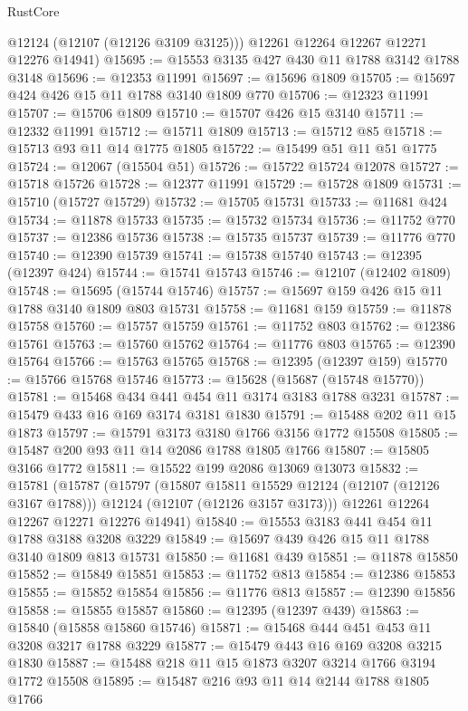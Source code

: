 \begin{lexlean}{RustCore}
\begin{coremodule}
        @12124
        (@12107 (@12126 @3109 @3125)))
      @12261
      @12264
      @12267
      @12271
      @12276
      @14941)
@15695 := @15553 @3135 @427 @430 @11 @1788 @3142 @1788 @3148
@15696 := @12353 @11991
@15697 := @15696 @1809
@15705 := @15697 @424 @426 @15 @11 @1788 @3140 @1809 @770
@15706 := @12323 @11991
@15707 := @15706 @1809
@15710 := @15707 @426 @15 @3140
@15711 := @12332 @11991
@15712 := @15711 @1809
@15713 := @15712 @85
@15718 := @15713 @93 @11 @14 @1775 @1805
@15722 := @15499 @51 @11 @51 @1775
@15724 := @12067 (@15504 @51)
@15726 := @15722 @15724 @12078
@15727 := @15718 @15726
@15728 := @12377 @11991
@15729 := @15728 @1809
@15731 := @15710 (@15727 @15729)
@15732 := @15705 @15731
@15733 := @11681 @424
@15734 := @11878 @15733
@15735 := @15732 @15734
@15736 := @11752 @770
@15737 := @12386 @15736
@15738 := @15735 @15737
@15739 := @11776 @770
@15740 := @12390 @15739
@15741 := @15738 @15740
@15743 := @12395 (@12397 @424)
@15744 := @15741 @15743
@15746 := @12107 (@12402 @1809)
@15748 := @15695 (@15744 @15746)
@15757 := @15697 @159 @426 @15 @11 @1788 @3140 @1809 @803 @15731
@15758 := @11681 @159
@15759 := @11878 @15758
@15760 := @15757 @15759
@15761 := @11752 @803
@15762 := @12386 @15761
@15763 := @15760 @15762
@15764 := @11776 @803
@15765 := @12390 @15764
@15766 := @15763 @15765
@15768 := @12395 (@12397 @159)
@15770 := @15766 @15768 @15746
@15773 := @15628 (@15687 (@15748 @15770))
@15781 := @15468 @434 @441 @454 @11 @3174 @3183 @1788 @3231
@15787 := @15479 @433 @16 @169 @3174 @3181 @1830
@15791 := @15488 @202 @11 @15 @1873
@15797 := @15791 @3173 @3180 @1766 @3156 @1772 @15508
@15805 := @15487 @200 @93 @11 @14 @2086 @1788 @1805 @1766
@15807 := @15805 @3166 @1772
@15811 := @15522 @199 @2086 @13069 @13073
@15832 := @15781
    (@15787
      (@15797
        (@15807 @15811 @15529 @12124 (@12107 (@12126 @3167 @1788)))
        @12124
        (@12107 (@12126 @3157 @3173)))
      @12261
      @12264
      @12267
      @12271
      @12276
      @14941)
@15840 := @15553 @3183 @441 @454 @11 @1788 @3188 @3208 @3229
@15849 := @15697 @439 @426 @15 @11 @1788 @3140 @1809 @813 @15731
@15850 := @11681 @439
@15851 := @11878 @15850
@15852 := @15849 @15851
@15853 := @11752 @813
@15854 := @12386 @15853
@15855 := @15852 @15854
@15856 := @11776 @813
@15857 := @12390 @15856
@15858 := @15855 @15857
@15860 := @12395 (@12397 @439)
@15863 := @15840 (@15858 @15860 @15746)
@15871 := @15468 @444 @451 @453 @11 @3208 @3217 @1788 @3229
@15877 := @15479 @443 @16 @169 @3208 @3215 @1830
@15887 := @15488 @218 @11 @15 @1873 @3207 @3214 @1766 @3194 @1772 @15508
@15895 := @15487 @216 @93 @11 @14 @2144 @1788 @1805 @1766

\end{coremodule}
\end{lexlean}

